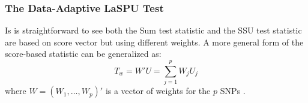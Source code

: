 \documentclass[12pt]{article}
\begin{document}
\subsubsection{The Data-Adaptive LaSPU Test} 
Is is straightforward to see both the Sum test statistic and the SSU test statistic are based on score vector but using different weights. A more general form of the score-based statistic can be generalized as:
$$
T_w = W' U = \sum_{j=1}^p W_j U_j
$$
where $W = (W_1, \ldots, W_p)'$ is a vector of weights for the $p$ SNPs \cite{Lin2011}. 
\end{document}
